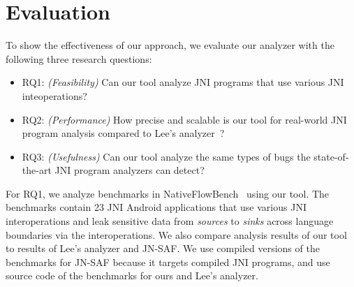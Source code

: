 \newcommand{\req}[1]{RQ#1}


\section{Evaluation}\label{sec:eval}

%
%

To show the effectiveness of our approach, we evaluate our analyzer with the
following three research questions:
\begin{itemize}
  \item \req{1}: {\it (Feasibility)} Can our tool analyze JNI programs that use
    various JNI inteoperations?

  \item \req{2}: {\it (Performance)} How precise and scalable is our tool for
    real-world JNI program analysis compared to Lee's analyzer~\cite{LeeASE20}?

  \item \req{3}: {\it (Usefulness)} Can our tool analyze the same types of bugs
    the state-of-the-art JNI program analyzers can detect?
\end{itemize}


For \req{1}, we analyze benchmarks in NativeFlowBench~\cite{nativeflowbench,
JN-SAF} using our tool. The benchmarks contain 23 JNI Android applications that
use various JNI interoperations and leak sensitive data from {\it sources} to
{\it sinks} across language boundaries via the interoperations. We also compare
analysis results of our tool to results of Lee's analyzer and JN-SAF. We use
compiled versions of the benchmarks for JN-SAF because it targets compiled JNI
programs, and use source code of the benchmarks for ours and Lee's analyzer.

